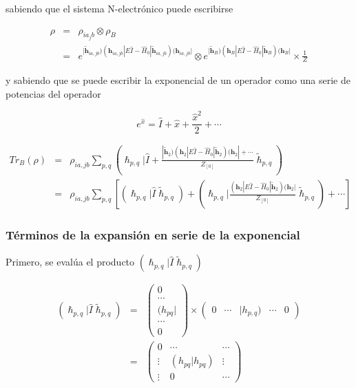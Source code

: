 \documentclass[
	12pt, %
]{fphw}
\begin{document}
sabiendo que el sistema N-electrónico puede escribirse 

\begin{eqnarray}
	\rho &=& \rho_{ia_jb} \otimes \rho_{B} \\
	&=& e^{| {\bm{\widetilde{h}}_{ia,jb} ) (\bm{h}_{ia,jb}| E \hat{I} - \hat{H}_0 | 
	\bm{\widetilde{h}}_{ia,jb} )   (\bm{h}_{ia,jb}|}} \otimes
	e^{| {\bm{\widetilde{h}}_B ) (\bm{h}_B| E \hat{I} - \hat{H}_0 | 
	\bm{\widetilde{h}}_B )   (\bm{h}_B|}} \times \frac{1}{Z}
\end{eqnarray}

y sabiendo que se puede escribir la exponencial de un operador como una serie de potencias del operador

\begin{equation}\label{exp_rho}
	e^{\hat{x}} = \hat{I} + \hat{x} + \frac{\hat{x}^2}{2} + \cdots
\end{equation}



\begin{eqnarray}\label{serie_rho}
	Tr_B (\rho) &=&  \rho_{ia,jb}  \sum_{p,q} ( \bm{\hslash}_{p,q} | \hat{I} + \frac{ | \bm{\widetilde{h}}_2 ) (\bm{h}_2| E \hat{I} - \hat{H}_0 |
	 \bm{\widetilde{h}}_2 )   (\bm{h}_2|  + \cdots}{Z_{[0]}}  \widetilde{\bm{\hslash}}_{p,q} ) \\
	 &=& \rho_{ia,jb} \sum_{p,q} \left[ ( \bm{\hslash}_{p,q} |  \hat{I} \widetilde{\bm{\hslash}}_{p,q} ) 
	  + ( \bm{\hslash}_{p,q} | \frac{(\bm{h}_2| E \hat{I} - \hat{H}_0 |
	 \bm{\widetilde{h}}_2 )   (\bm{h}_2|}{Z_{[0]}} \widetilde{\bm{\hslash}}_{p,q} ) + \cdots \right]   
\end{eqnarray}






\subsubsection*{Términos de la expansión en serie de la exponencial}
Primero, se evalúa el producto $( \bm{\hslash}_{p,q} |\hat{I} \bm{\widetilde{\hslash}}_{p,q} )$


\begin{eqnarray}
	( \bm{\hslash}_{p,q} |\hat{I} \bm{\widetilde{\hslash}}_{p,q} ) &=& 
	\begin{pmatrix}
		0 \\\cdots\\
		(h_{pq}| \\
		\cdots \\
		0 \end{pmatrix}
 \times \begin{pmatrix}
	0 & \cdots & |h_{p,q})& \cdots& 0
\end{pmatrix} \\
	&=& \begin{pmatrix}
		0 & \cdots &  \cdots  \\
		\vdots & (h_{pq} | h_{pq}) & \vdots \\
		\vdots & 0 & \cdots
		\end{pmatrix}
\end{eqnarray}
\end{document}
